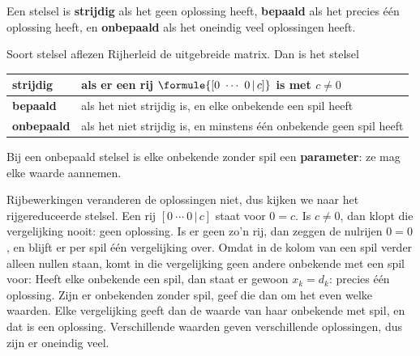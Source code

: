 \begin{theorie}
Een stelsel is \textbf{\textcolor{accent}{strijdig}} als het geen oplossing heeft, \textbf{\textcolor{accent}{bepaald}} als het precies één oplossing heeft, en \textbf{\textcolor{accent}{onbepaald}} als het oneindig veel oplossingen heeft.

\begin{stelling}{Soort stelsel aflezen}
Rijherleid de uitgebreide matrix. Dan is het stelsel

\vspace{1mm}
{\centering{}\renewcommand{\arraystretch}{1.5}%
\begin{tabular}{|>{\centering\arraybackslash}m{2.5cm}|>{\centering\arraybackslash}m{9.6cm}|}
\hline
\textbf{\textcolor{accent}{strijdig}} & als er een rij $\formule{[0 \ \cdots \ 0 \,|\, c]}$ is met $c \neq 0$ \\ \hline
\textbf{\textcolor{accent}{bepaald}} & als het niet strijdig is, en elke onbekende een spil heeft \\ \hline
\textbf{\textcolor{accent}{onbepaald}} & als het niet strijdig is, en minstens één onbekende geen spil heeft \\ \hline
\end{tabular}\par}

\vspace{1mm}
Bij een onbepaald stelsel is elke onbekende zonder spil een \textbf{\textcolor{accent}{parameter}}: ze mag elke waarde aannemen.
\end{stelling}

\begin{bewijs}
Rijbewerkingen veranderen de oplossingen niet, dus kijken we naar het rijgereduceerde stelsel. Een rij $[0 \ \cdots \ 0 \,|\, c]$ staat voor $0 = c$. Is $c \neq 0$, dan klopt die vergelijking nooit: geen oplossing. Is er geen zo'n rij, dan zeggen de nulrijen $0 = 0$, en blijft er per spil één vergelijking over. Omdat in de kolom van een spil verder alleen nullen staan, komt in die vergelijking geen andere onbekende met een spil voor:
Heeft elke onbekende een spil, dan staat er gewoon $x_k = d_k$: precies één oplossing. Zijn er onbekenden zonder spil, geef die dan om het even welke waarden. Elke vergelijking geeft dan de waarde van haar onbekende met spil, en dat is een oplossing. Verschillende waarden geven verschillende oplossingen, dus zijn er oneindig veel.
\end{bewijs}
\end{theorie}

